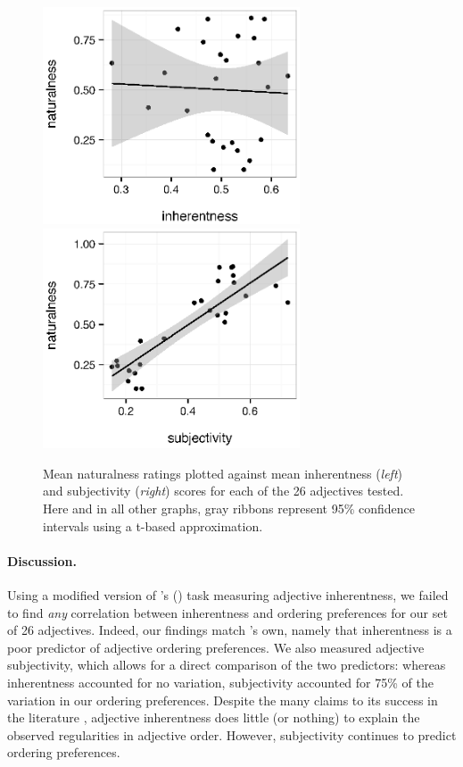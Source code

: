 \documentclass[12pt]{article}
\newcommand{\jd}[1]{\textcolor{red}{[jd: #1]}}
\begin{document}
\renewcommand\thefigure{S.\arabic{figure}}
\begin{figure}
	\centering\includegraphics[width=3in]{plots/expt1-inherentness-naturalness.eps}\includegraphics[width=3in]{plots/expt1-subjectivity2-naturalness.eps}
	\caption{Mean naturalness ratings plotted against mean inherentness (\emph{left}) and subjectivity (\emph{right}) scores for each of the 26 adjectives tested. Here and in all other graphs, gray ribbons represent 95\% confidence intervals using a t-based approximation.}\label{fig:inherentness}
\end{figure}

\paragraph{Discussion.} Using a modified version of \citeauthor{martin1969}'s (\citeyear{martin1969}) task measuring adjective inherentness, we failed to find \emph{any} correlation between inherentness and ordering preferences for our set of 26 adjectives. Indeed, our findings match \citeauthor{martin1969}'s own, namely that inherentness is a poor predictor of adjective ordering preferences. %
We also measured adjective subjectivity, which allows for a direct comparison of the two predictors: whereas inherentness accounted for no variation, subjectivity accounted for 75\% of the variation in our ordering preferences. Despite the many claims to its success in the literature \citep[e.g.,][]{sweet1898,whorf1945,kemmerer2000}, adjective inherentness does little (or nothing) to explain the observed regularities in adjective order. However, subjectivity continues to predict ordering preferences.
\end{document}
